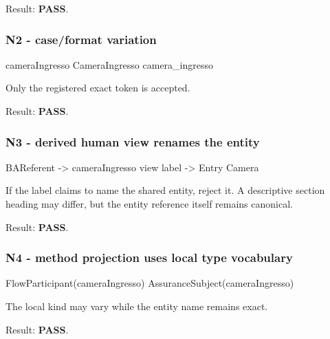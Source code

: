 \documentclass[
  10pt,
  a4paper,
]{article}
\newenvironment{Shaded}{}{}
\newcommand{\NormalTok}[1]{#1}
\begin{document}
Result: \textbf{PASS}.

\subsubsection{N2 - case/format
variation}\label{n2---caseformat-variation}

\begin{Shaded}
\begin{Highlighting}[]
\NormalTok{cameraIngresso}
\NormalTok{CameraIngresso}
\NormalTok{camera\_ingresso}
\end{Highlighting}
\end{Shaded}

Only the registered exact token is accepted.

Result: \textbf{PASS}.

\subsubsection{N3 - derived human view renames the
entity}\label{n3---derived-human-view-renames-the-entity}

\begin{Shaded}
\begin{Highlighting}[]
\NormalTok{BAReferent {-}\textgreater{} cameraIngresso}
\NormalTok{view label {-}\textgreater{} Entry Camera}
\end{Highlighting}
\end{Shaded}

If the label claims to name the shared entity, reject it. A descriptive
section heading may differ, but the entity reference itself remains
canonical.

Result: \textbf{PASS}.

\subsubsection{N4 - method projection uses local type
vocabulary}\label{n4---method-projection-uses-local-type-vocabulary}

\begin{Shaded}
\begin{Highlighting}[]
\NormalTok{FlowParticipant(cameraIngresso)}
\NormalTok{AssuranceSubject(cameraIngresso)}
\end{Highlighting}
\end{Shaded}

The local kind may vary while the entity name remains exact.

Result: \textbf{PASS}.
\end{document}
